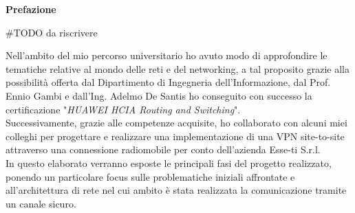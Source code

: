 \clearpage
\phantom{a}
\vfill

\begin{center}
    \textbf{Prefazione}
\end{center}

\begin{flushleft}

    \#TODO da riscrivere 

    Nell'ambito del mio percorso universitario ho avuto modo di approfondire le tematiche relative al mondo delle reti e del networking, a tal proposito grazie alla possibilità offerta dal Dipartimento di Ingegneria dell'Informazione, dal Prof. Ennio Gambi e dall'Ing. Adelmo De Santis ho conseguito con successo la certificazione "\textit{HUAWEI HCIA Routing and Switching}".\\
    Successivamente, grazie alle competenze acquisite, ho collaborato con alcuni miei colleghi
    per progettare e realizzare una implementazione di una VPN site-to-site attraverso una connessione radiomobile per conto dell'azienda Esse-ti S.r.l.\\
    In questo elaborato verranno esposte le principali fasi del
    progetto realizzato, ponendo un particolare focus sulle problematiche iniziali affrontate e all'architettura di rete nel cui ambito è stata realizzata la comunicazione tramite un canale sicuro.
    

\end{flushleft}



\vfill
\newpage